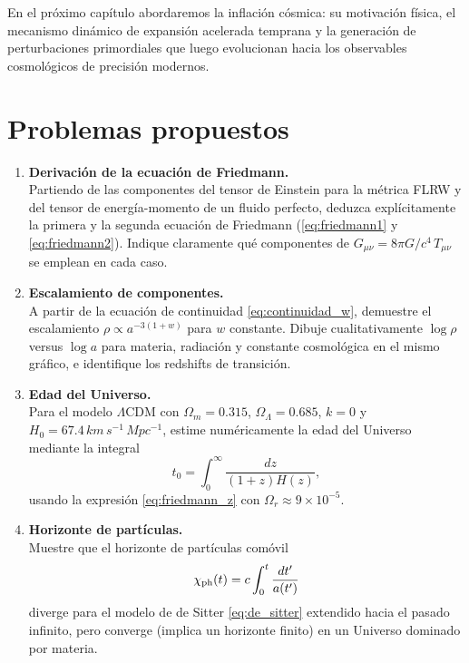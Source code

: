 En el próximo capítulo abordaremos la inflación cósmica: su motivación física, el mecanismo dinámico de expansión acelerada temprana y la generación de perturbaciones primordiales que luego evolucionan hacia los observables cosmológicos de precisión modernos.

\section*{Problemas propuestos}

\begin{enumerate}[leftmargin=2.2em, label=\textbf{P\arabic*.}]

\item \textbf{Derivación de la ecuación de Friedmann.} \\
Partiendo de las componentes del tensor de Einstein para la métrica FLRW y del tensor de energía-momento de un fluido perfecto, deduzca explícitamente la primera y la segunda ecuación de Friedmann (\ref{eq:friedmann1} y \ref{eq:friedmann2}). Indique claramente qué componentes de $G_{\mu\nu}=8\pi G/c^4\,T_{\mu\nu}$ se emplean en cada caso.

\item \textbf{Escalamiento de componentes.} \\
A partir de la ecuación de continuidad \eqref{eq:continuidad_w}, demuestre el escalamiento $\rho\propto a^{-3(1+w)}$ para $w$ constante. Dibuje cualitativamente $\log\rho$ versus $\log a$ para materia, radiación y constante cosmológica en el mismo gráfico, e identifique los redshifts de transición.

\item \textbf{Edad del Universo.} \\
Para el modelo $\Lambda$CDM con $\Omega_m=0.315$, $\Omega_\Lambda=0.685$, $k=0$ y $H_0=67.4\,\si{km\,s^{-1}\,Mpc^{-1}}$, estime numéricamente la edad del Universo mediante la integral
\begin{equation}
  t_0 = \int_0^\infty \frac{dz}{(1+z)H(z)},
\end{equation}
usando la expresión \eqref{eq:friedmann_z} con $\Omega_r\approx 9\times10^{-5}$.

\item \textbf{Horizonte de partículas.} \\
Muestre que el horizonte de partículas comóvil
\begin{equation}
  \chi_{\rm ph}(t) = c\int_0^t \frac{dt'}{a(t')}
\end{equation}
diverge para el modelo de de Sitter \eqref{eq:de_sitter} extendido hacia el pasado infinito, pero converge (implica un horizonte finito) en un Universo dominado por materia.


\end{enumerate}

